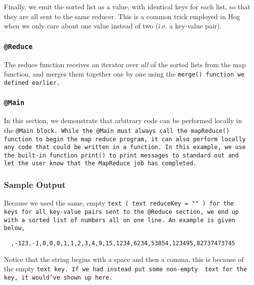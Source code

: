 \documentclass{article} \usepackage{fancyhdr, multicol}
\begin{document}
Finally, we emit the sorted list as a value, with identical keys for each list, so
that they are all sent to the same reducer. This is a common trick employed in Hog
when we only care about one value instead of two (i.e. a key-value pair).

\subsubsection*{\tt @Reduce \rm}

The reduce function receives an iterator over \emph{all} of the sorted lists from
the map function, and merges them together one by one using the \tt merge() \rm
function we defined earlier.

\subsubsection*{\tt @Main \rm}

In this section, we demonstrate that arbitrary code can be performed locally in the
\tt @Main \rm block. While the \tt @Main \rm must always call the \tt mapReduce()
\rm function to begin the map reduce program, it can also perform locally any code
that could be written in a function. In this example, we use the built-in function
\tt print() \rm to print messages to standard out and let the user know that the
MapReduce job has completed.

\subsubsection*{Sample Output}

Because we used the same, empty \tt text \rm ( \tt text reduceKey = "" \rm) for the
keys for all key-value pairs sent to the \tt @Reduce \rm section, we end up with a
sorted list of numbers all on one line. An example is given below,

\begin{verbatim}
  ,-123,-1,0,0,0,1,1,2,3,4,9,15,1234,6234,53854,123495,82737473745
\end{verbatim}

\noindent Notice that the string begins with a space and then a comma, this is
because of the empty \tt text \rm key. If we had instead put some non-empty \tt
text \rm for the key, it would've shown up here.
\end{document}
